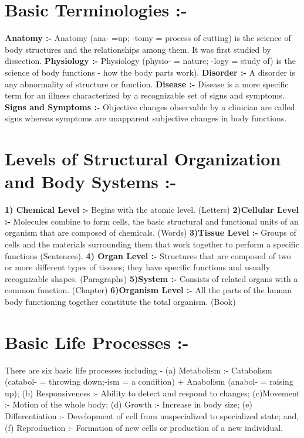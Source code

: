 \documentclass[12pt]{article}
\begin{document}
\raggedright
\begin{small}
\section{Basic Terminologies :-}
\raggedright
\textbf{Anatomy :-} Anatomy (ana- =up; -tomy = process of cutting) is the science of body structures and the relationships among them. It was first studied by dissection.
\linebreak
\textbf{Physiology :-} Physiology (physio- = nature; -logy = study of) is the science of body functions - how the body parts work).
\linebreak
\textbf{Disorder :-} A disorder is any abnormality of structure or function.
\linebreak
\textbf{Disease :-} Disease is a more specific term for an illness characterized by a recognizable set of signs and symptoms.
\linebreak
\textbf{Signs and Symptoms :-} Objective changes observable by a clinician are called signs whereas symptoms are unapparent subjective changes in body functions.



\section{Levels of Structural Organization and Body Systems :-}
\textbf{1) Chemical Level :-} Begins with the atomic level. (Letters)
\linebreak
\textbf{2)Cellular Level :-} Molecules combine to form cells, the basic structural and functional units of an organism that are composed of chemicals. (Words)
\linebreak
\textbf{3)Tissue Level :-}  Groups of cells and the materials surrounding them that work together to perform a specific functions (Sentences).
\linebreak
\textbf{4) Organ Level :-} Structures that are composed of two or more different types of tissues; they have specific functions and usually recognizable shapes. (Paragraphs)
\linebreak
\textbf{5)System :-} Consists of related organs with a common function. (Chapter)
\linebreak
\textbf{6)Organism Level :-} All the parts of the human body functioning together constitute the total organism. (Book)
\linebreak
\section{Basic Life Processes :-}
There are six basic life processes including - (a) Metabolism :- Catabolism (catabol- = throwing down;-ism = a condition) + Anabolism (anabol- = raising up); (b) Responsiveness :- Ability to detect and respond to changes; (c)Movement :- Motion of the whole body; (d) Growth :- Increase in body size; (e) Differentiation :- Development of cell from unspecialized to specialized state; and, (f) Reproduction :- Formation of new cells or production of a new individual.


\end{small}
\end{document}
